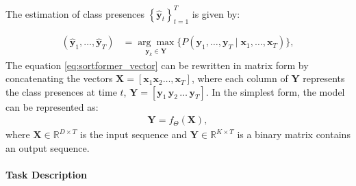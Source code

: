 \documentclass{article}
\begin{document}
The estimation of class presences $\left\{\hat{\mathbf{y}}_t\right\}_{t=1}^T$ is given by:

\begin{align}
  (\hat{\mathbf{y}}_1, \ldots, \hat{\mathbf{y}}_T) & = \underset{\mathbf{y}_k \in \mathbf{Y}}{\arg\max} \big\{ P\left(\mathbf{y}_1, \ldots, \mathbf{y}_T \mid \mathbf{x}_1, \ldots, \mathbf{x}_T\right) \big\},
  \label{eq:sortformer_vector}
\end{align}
The equation \ref{eq:sortformer_vector} can be rewritten in matrix form by concatenating the vectors $ \mathbf{X} = [ \mathbf{x}_1 \mathbf{x}_2 \ldots, \mathbf{x}_T ] $,
where each column of $\mathbf{Y}$ represents the class presences at time $t$, $ \mathbf{Y} = [\mathbf{y}_1 \, \mathbf{y}_2 \, \ldots \, \mathbf{y}_T]$.
In the simplest form, the model can be represented as:
\begin{align}
  \mathbf{Y} = f_{\Theta}\left(\mathbf{X}\right),
\end{align}
where \( \mathbf{X} \in \mathbb{R}^{D \times T} \) is the input sequence and \( \mathbf{Y} \in \mathbb{R}^{K \times T} \) is a binary matrix contains an output sequence.

\paragraph{Task Description}

\end{document}

